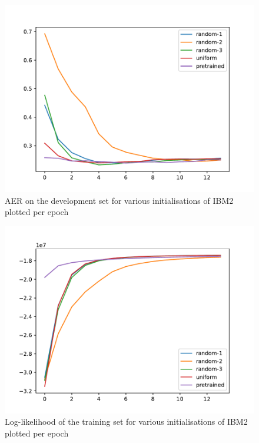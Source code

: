 \documentclass[11pt,a4paper]{article}
\begin{document}
\begin{figure}
\includegraphics[width=\linewidth]{images/AERs-together.pdf}
\caption{AER on the development set for various initialisations of IBM2 plotted per epoch}
\label{fig:AERs-together}
\end{figure}

\begin{figure}
\includegraphics[width=\linewidth]{images/likelihoods.pdf}
\caption{Log-likelihood of the training set for various initialisations of IBM2 plotted per epoch}
\label{fig:AERs-together}
\end{figure}
\end{document}
